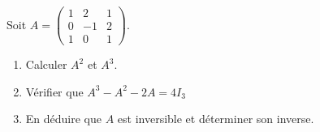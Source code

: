 \documentclass[11pt,fleqn]{book} %
\begin{document}
\begin{exercise}[topic=mat03]
\begin{minipage}{0.3\linewidth}Soit $A=\begin{pmatrix}1 & 2 & 1\\0&-1&2\\1&0&1 \end{pmatrix}$.
\end{minipage}\hfill \begin{minipage}{0.65\linewidth}
\begin{enumerate}
\item Calculer $A^2$ et $A^3$.
\item Vérifier que $A^3-A^2-2A=4I_3$
\item En déduire que $A$ est inversible et déterminer son inverse.
\end{enumerate}
\end{minipage}
\end{exercise}
\end{document}
